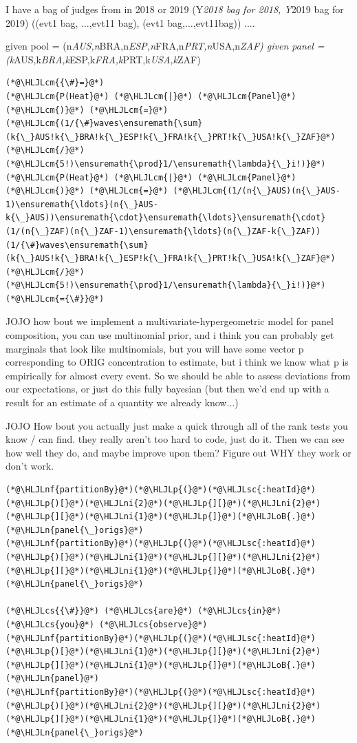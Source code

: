 \documentclass[12pt,a4paper]{article}
\newcommand{\HLJLn}[1]{#1}
\newcommand{\HLJLnf}[1]{\textcolor[RGB]{66,102,213}{#1}}
\newcommand{\HLJLsc}[1]{\textcolor[RGB]{201,61,57}{#1}}
\newcommand{\HLJLni}[1]{\textcolor[RGB]{59,151,46}{#1}}
\newcommand{\HLJLoB}[1]{\textcolor[RGB]{102,102,102}{\textbf{#1}}}
\newcommand{\HLJLp}[1]{#1}
\newcommand{\HLJLcm}[1]{\textcolor[RGB]{153,153,119}{\textit{#1}}}
\newcommand{\HLJLcs}[1]{\textcolor[RGB]{153,153,119}{\textit{#1}}}
\begin{document}
I have a bag of judges from in 2018 or 2019 (Y\emph{2018 bag for 2018, Y}2019 bag for 2019) ((evt1 bag, \ensuremath{\ldots},evt11 bag), (evt1 bag,\ensuremath{\ldots},evt11bag)) ....


given pool = (n\emph{AUS,n}BRA,n\emph{ESP,n}FRA,n\emph{PRT,n}USA,n\emph{ZAF) given panel = (k}AUS,k\emph{BRA,k}ESP,k\emph{FRA,k}PRT,k\emph{USA,k}ZAF)


\begin{lstlisting}
(*@\HLJLcm{{\#}=}@*)
(*@\HLJLcm{P(Heat}@*) (*@\HLJLcm{|}@*) (*@\HLJLcm{Panel}@*) (*@\HLJLcm{)}@*) (*@\HLJLcm{=}@*) (*@\HLJLcm{(1/{\#}waves\ensuremath{\sum}(k{\_}AUS!k{\_}BRA!k{\_}ESP!k{\_}FRA!k{\_}PRT!k{\_}USA!k{\_}ZAF}@*) (*@\HLJLcm{/}@*) (*@\HLJLcm{5!)\ensuremath{\prod}1/\ensuremath{\lambda}{\_}i!)}@*) 
(*@\HLJLcm{P(Heat}@*) (*@\HLJLcm{|}@*) (*@\HLJLcm{Panel}@*) (*@\HLJLcm{)}@*) (*@\HLJLcm{=}@*) (*@\HLJLcm{(1/(n{\_}AUS)(n{\_}AUS-1)\ensuremath{\ldots}(n{\_}AUS-k{\_}AUS))\ensuremath{\cdot}\ensuremath{\ldots}\ensuremath{\cdot}(1/(n{\_}ZAF)(n{\_}ZAF-1)\ensuremath{\ldots}(n{\_}ZAF-k{\_}ZAF))(1/{\#}waves\ensuremath{\sum}(k{\_}AUS!k{\_}BRA!k{\_}ESP!k{\_}FRA!k{\_}PRT!k{\_}USA!k{\_}ZAF}@*) (*@\HLJLcm{/}@*) (*@\HLJLcm{5!)\ensuremath{\prod}1/\ensuremath{\lambda}{\_}i!)}@*) 
(*@\HLJLcm{={\#}}@*)
\end{lstlisting}


JOJO how bout we implement a multivariate-hypergeometric model for panel composition, you can use multinomial prior, and i think you can probably get marginals that look like multinomials, but you will have some vector p corresponding to ORIG concentration to estimate, but i think we know what p is empirically for almost every event. So we should be able to assess deviations from our expectations, or just do this fully bayesian (but then we'd end up with a result for an estimate of a quantity we already know...)


JOJO How bout you actually just make a quick through all of the rank tests you know / can find. they really aren't too hard to code, just do it. Then we can see how well they do, and maybe improve upon them? Figure out WHY they work or don't work.


\begin{lstlisting}
(*@\HLJLnf{partitionBy}@*)(*@\HLJLp{(}@*)(*@\HLJLsc{:heatId}@*)(*@\HLJLp{)[}@*)(*@\HLJLni{2}@*)(*@\HLJLp{][}@*)(*@\HLJLni{2}@*)(*@\HLJLp{][}@*)(*@\HLJLni{1}@*)(*@\HLJLp{]}@*)(*@\HLJLoB{.}@*)(*@\HLJLn{panel{\_}origs}@*)
(*@\HLJLnf{partitionBy}@*)(*@\HLJLp{(}@*)(*@\HLJLsc{:heatId}@*)(*@\HLJLp{)[}@*)(*@\HLJLni{1}@*)(*@\HLJLp{][}@*)(*@\HLJLni{2}@*)(*@\HLJLp{][}@*)(*@\HLJLni{1}@*)(*@\HLJLp{]}@*)(*@\HLJLoB{.}@*)(*@\HLJLn{panel{\_}origs}@*)

(*@\HLJLcs{{\#}}@*) (*@\HLJLcs{are}@*) (*@\HLJLcs{in}@*) (*@\HLJLcs{you}@*) (*@\HLJLcs{observe}@*)
(*@\HLJLnf{partitionBy}@*)(*@\HLJLp{(}@*)(*@\HLJLsc{:heatId}@*)(*@\HLJLp{)[}@*)(*@\HLJLni{1}@*)(*@\HLJLp{][}@*)(*@\HLJLni{2}@*)(*@\HLJLp{][}@*)(*@\HLJLni{1}@*)(*@\HLJLp{]}@*)(*@\HLJLoB{.}@*)(*@\HLJLn{panel}@*)
(*@\HLJLnf{partitionBy}@*)(*@\HLJLp{(}@*)(*@\HLJLsc{:heatId}@*)(*@\HLJLp{)[}@*)(*@\HLJLni{2}@*)(*@\HLJLp{][}@*)(*@\HLJLni{2}@*)(*@\HLJLp{][}@*)(*@\HLJLni{1}@*)(*@\HLJLp{]}@*)(*@\HLJLoB{.}@*)(*@\HLJLn{panel{\_}origs}@*)
\end{lstlisting}
\end{document}
